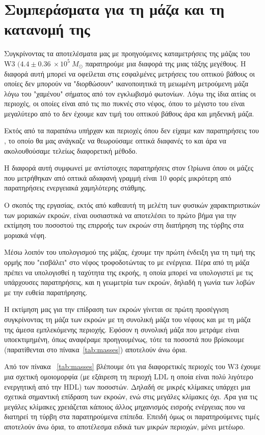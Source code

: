 \documentclass[a4paper,12pt]{memoir}
\newcommand{\e}[1]{\times 10^{#1}}
\begin{document}
\section*{Συμπεράσματα για τη μάζα και τη κατανομή της}
Συγκρίνοντας τα αποτελέσματα μας με προηγούμενες καταμετρήσεις της μάζας του W3 $(4.4\pm 0.36 \: \e{5} \ M_{\odot}$ \cite{moore_2007,polychroni_gas_2012} παρατηρούμε μια διαφορά της μιας τάξης μεγέθους. Η διαφορά αυτή μπορεί να οφείλεται στις εσφαλμένες μετρήσεις του οπτικού βάθους οι οποίες δεν μπορούν να "διορθώσουν" ικανοποιητικά τη μειωμένη μετρούμενη μάζα λόγω του "χαμένου" σήματος από τον εγκλωβισμό φωτονίων. Λόγω της ίδια αιτίας οι περιοχές, οι οποίες είναι από τις πιο πυκνές στο νέφος, όπου το μέγιστο του  είναι μεγαλύτερο από το  δεν έχουμε καν τιμή του οπτικού βάθους άρα και μηδενική μάζα.

Εκτός από τα παραπάνω υπήρχαν και περιοχές όπου δεν είχαμε καν παρατηρήσεις του , το οποίο θα μας ανάγκαζε να θεωρούσαμε οπτικά διαφανές το  και άρα να ακολουθούσαμε τελείως διαφορετική μέθοδο.

Η διαφορά αυτή συμφωνεί με αντίστοιχες παρατηρήσεις στον Ωρίωνα \cite{buckle_2010} όπου οι μάζες που μετρήθηκαν από οπτικά αδιαφανή γραμμή   είναι 10 φορές μικρότερη από παρατηρήσεις ενεργειακά χαμηλότερης στάθμης.

Ο σκοπός της εργασίας, εκτός από καθεαυτή τη μελέτη των φυσικών χαρακτηριστικών των μοριακών εκροών, είναι ουσιαστικά να αποτελέσει το πρώτο βήμα για την εκτίμηση του ποσοστού της επιρροής των εκροών στη διατήρηση της τύρβης στα μοριακά νέφη.

Μέσω λοιπόν του υπολογισμού της μάζας, έχουμε την πρώτη ένδειξη για τη τιμή της ορμής που "εισβάλει" στο νέφος  τροφοδοτώντας το με ενέργεια. Πέρα από τη μάζα πρέπει να υπολογισθεί η ταχύτητα της εκροής, η οποία μπορεί να υπολογιστεί με τις υπάρχουσες παρατηρήσεις, και η γεωμετρία των εκροών, δηλαδή η γωνία των λοβών με την ευθεία παρατήρησης. 

Η εκτίμηση μας για την επίδραση των εκροών γίνεται σε πρώτη προσέγγιση συγκρίνοντας τη μάζα των εκροών με τη συνολική μάζα του νέφους και με τη μάζα της άμεσα εμπλεκόμενης περιοχής.
Εφόσον η συνολική μάζα που μετράμε είναι υποεκτιμημένη, όπως αναφέραμε προηγουμένως, τότε τα ποσοστά που βρίσκουμε (παρατίθενται στο πίνακα~\ref{tab:masses}) αποτελούν άνω όρια.

Από τον πίνακα ~\ref{tab:masses} βλέπουμε ότι για διαφορετικές περιοχές του W3 έχουμε μια σχετική ομοιομορφία (με εξάιρεση τη περιοχή LDL η οποία είναι πολύ λιγότερο ενεργητική από την HDL) των ποσοστών. Δηλαδή σε μικρές κλίμακες υπάρχει μια σχετικά σημαντική επίδραση των εκροών, ενώ στις μεγάλες κλίμακες όχι. Άρα για τις μεγάλες κλίμακες χρειάζεται κάποιος άλλος μηχανισμός εισροής ενέργειας που να διατηρεί τη τύρβη στα παρατηρούμενα επίπεδα. Επειδή όμως οι παρατηρούμενες τιμές αποτελούν άνω όρια, το αποτέλεσμα ειδικά των μικρών περιοχών, μένει μετέωρο. 
 
\end{document}

